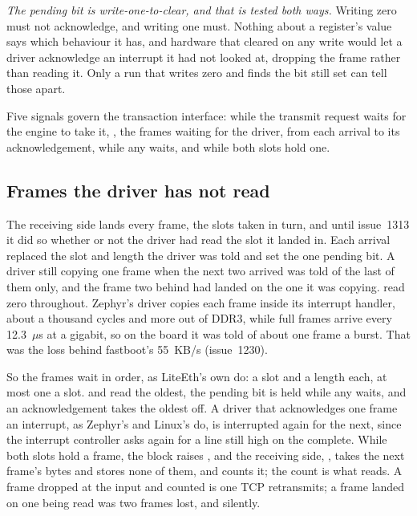 \emph{The pending bit is write-one-to-clear, and that is tested both
ways.} Writing zero must not acknowledge, and writing one must.
Nothing about a register's value says which behaviour it has, and
hardware that cleared on any write would let a driver acknowledge an
interrupt it had not looked at, dropping the frame rather than
reading it. Only a run that writes zero and finds the bit still set
can tell those apart.

Five signals govern the transaction interface:  while the transmit
request waits for the engine to take it, , the frames
waiting for the driver, from each arrival to its acknowledgement,
 while any waits, and  while both slots
hold one.



\subsection{Frames the driver has not read}

The receiving side lands every frame, the slots taken in turn, and
until issue~1313 it did so whether or not the driver had read the
slot it landed in. Each arrival replaced the slot and length the
driver was told and set the one pending bit. A driver still copying
one frame when the next two arrived was told of the last of them
only, and the frame two behind had landed on the one it was copying.
 read zero throughout. Zephyr's driver copies each
frame inside its interrupt handler, about a thousand cycles and more
out of DDR3, while full frames arrive every 12.3~$\mu$s at a
gigabit, so on the board it was told of about one frame a burst.
That was the loss behind fastboot's 55~KB/s (issue~1230).

So the frames wait in order, as LiteEth's own do: a slot and a length
each, at most one a slot.  and  read
the oldest, the pending bit is held while any waits, and an
acknowledgement takes the oldest off. A driver that acknowledges one
frame an interrupt, as Zephyr's and Linux's do, is interrupted again
for the next, since the interrupt controller asks again for a line
still high on the complete. While both slots hold a frame, the block
raises , and the receiving side, , takes
the next frame's bytes and stores none of them, and counts it; the
count is what  reads. A frame dropped at the input
and counted is one TCP retransmits; a frame landed on one being read
was two frames lost, and silently.

